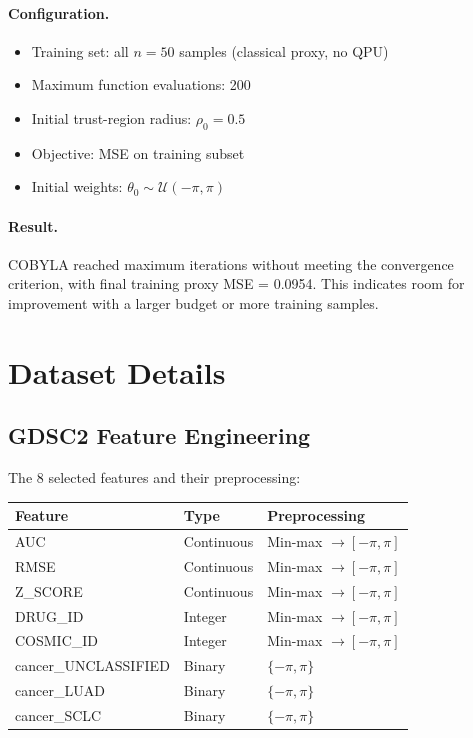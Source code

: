 \documentclass[12pt,a4paper]{article}
\begin{document}
\paragraph{Configuration.}
\begin{itemize}
  \item Training set: all $n = 50$ samples (classical proxy, no QPU)
  \item Maximum function evaluations: 200
  \item Initial trust-region radius: $\rho_0 = 0.5$
  \item Objective: MSE on training subset
  \item Initial weights: $\theta_0 \sim \mathcal{U}(-\pi, \pi)$
\end{itemize}

\paragraph{Result.}
COBYLA reached maximum iterations without meeting the convergence criterion,
with final training proxy MSE = 0.0954.  This indicates
room for improvement with a larger budget or more training samples.

\section{Dataset Details}
\label{sec:dataset}

\subsection{GDSC2 Feature Engineering}
The 8 selected features and their preprocessing:

\begin{center}
\begin{tabular}{@{}lll@{}}
\toprule
\textbf{Feature} & \textbf{Type} & \textbf{Preprocessing} \\
\midrule
AUC             & Continuous & Min-max $\to [-\pi,\pi]$ \\
RMSE            & Continuous & Min-max $\to [-\pi,\pi]$ \\
Z\_SCORE        & Continuous & Min-max $\to [-\pi,\pi]$ \\
DRUG\_ID        & Integer    & Min-max $\to [-\pi,\pi]$ \\
COSMIC\_ID      & Integer    & Min-max $\to [-\pi,\pi]$ \\
cancer\_UNCLASSIFIED & Binary & $\{-\pi, \pi\}$ \\
cancer\_LUAD    & Binary     & $\{-\pi, \pi\}$ \\
cancer\_SCLC    & Binary     & $\{-\pi, \pi\}$ \\
\bottomrule
\end{tabular}
\end{center}
\end{document}
